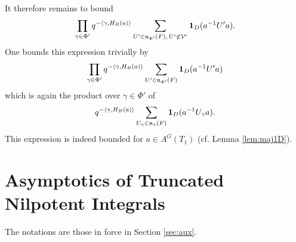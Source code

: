 \begin{paragr}
\begin{preuve}
It therefore remains to bound
$$\prod_{\gamma\in \Phi'} q^{-\langle \gamma,H_B(a)\rangle} \sum_{U'\in \mathfrak{n}_{\Phi'}(F),\, U'\notin \mathcal{V}'} \mathbf{1}_D(a^{-1}U'a).$$
One bounds this expression trivially by
$$\prod_{\gamma\in \Phi'} q^{-\langle \gamma,H_B(a)\rangle} \sum_{U'\in \mathfrak{n}_{\Phi'}(F)} \mathbf{1}_D(a^{-1}U'a)$$
which is again the product over $\gamma\in \Phi'$ of
$$q^{-\langle \gamma,H_B(a)\rangle} \sum_{U_\gamma\in \mathfrak{n}_\gamma(F)} \mathbf{1}_D(a^{-1}U_\gamma a).$$
This expression is indeed bounded for $a\in A^G(T_1)$ (cf. Lemma \ref{lem:maj1D}).
\end{preuve}
\end{paragr}

\section{Asymptotics of Truncated Nilpotent Integrals}\label{sec:asymp}

\begin{paragr}
The notations are those in force in Section \ref{sec:aux}.
\end{paragr}

